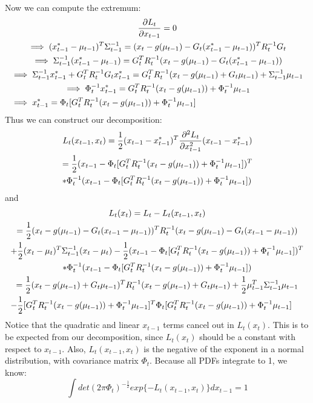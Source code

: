 Now we can compute the extremum:
\begin{multline}
\frac{\partial L_t}{\partial x_{t-1}} = 0 \\
\implies (x_{t-1}^* - \mu_{t-1})^T \Sigma_{t-1}^{-1} = (x_t - g(\mu_{t-1}) - G_t (x_{t-1}^* - \mu_{t-1}))^T R_t^{-1} G_t \\
\implies \Sigma_{t-1}^{-1} (x_{t-1}^* - \mu_{t-1}) = G_t^T R_t^{-1}  (x_t - g(\mu_{t-1}) - G_t (x_{t-1}^* - \mu_{t-1})) \\
\implies \Sigma_{t-1}^{-1} x_{t-1}^* + G_t^T R_t^{-1}G_t x_{t-1}^* = G_t^T R_t^{-1}  (x_t - g(\mu_{t-1}) + G_t \mu_{t-1}) + \Sigma_{t-1}^{-1} \mu_{t-1} \\
\implies \Phi_t^{-1} x_{t-1}^* = G_t^T R_t^{-1}  (x_t - g(\mu_{t-1})) + \Phi_t^{-1} \mu_{t-1} \\
\implies x_{t-1}^* = \Phi_t [G_t^T R_t^{-1}  (x_t - g(\mu_{t-1})) + \Phi_t^{-1} \mu_{t-1}] \hfill
\end{multline}
Thus we can construct our decomposition:
\begin{multline*}
L_t(x_{t-1},x_t) = \frac{1}{2} (x_{t-1} - x_{t-1}^*)^T \frac{\partial^2 L_t}{\partial x_{t-1}^2} (x_{t-1} - x_{t-1}^*) \\
= \frac{1}{2} (x_{t-1} - \Phi_t [G_t^T R_t^{-1}  (x_t - g(\mu_{t-1})) + \Phi_t^{-1} \mu_{t-1}])^T \\
* \Phi_t^{-1} (x_{t-1} - \Phi_t [G_t^T R_t^{-1}  (x_t - g(\mu_{t-1})) + \Phi_t^{-1} \mu_{t-1}]) \hfill
\end{multline*}
and
\begin{multline} \label{eqDefLtxt}
L_t(x_t) = L_t -  L_t(x_{t-1},x_t) \\
= \frac{1}{2} (x_t - g(\mu_{t-1}) - G_t (x_{t-1} - \mu_{t-1}))^T R_t^{-1} (x_t - g(\mu_{t-1}) - G_t (x_{t-1} - \mu_{t-1}))\\
+ \frac{1}{2} (x_t - \mu_t)^T \Sigma_{t-1}^{-1} (x_t - \mu_t) - \frac{1}{2} (x_{t-1} - \Phi_t [G_t^T R_t^{-1}  (x_t - g(\mu_{t-1})) + \Phi_t^{-1} \mu_{t-1}])^T \\
* \Phi_t^{-1} (x_{t-1} - \Phi_t [G_t^T R_t^{-1}  (x_t - g(\mu_{t-1})) + \Phi_t^{-1} \mu_{t-1}]) \\
= \frac{1}{2} (x_t - g(\mu_{t-1}) + G_t \mu_{t-1})^T R_t^{-1} (x_t - g(\mu_{t-1}) + G_t \mu_{t-1}) + \frac{1}{2} \mu_{t-1}^T \Sigma_{t-1}^{-1} \mu_{t-1} \\
- \frac{1}{2} [G_t^T R_t^{-1}  (x_t - g(\mu_{t-1})) + \Phi_t^{-1} \mu_{t-1}]^T \Phi_t [G_t^T R_t^{-1}  (x_t - g(\mu_{t-1})) + \Phi_t^{-1} \mu_{t-1}] \hfill
\end{multline}
Notice that the quadratic and linear \(x_{t-1}\) terms cancel out in \(L_t(x_t)\). This is to be expected from our decomposition, since \(L_t(x_t)\) should be a constant with respect to \(x_{t-1}\). Also, \(L_t(x_{t-1},x_t)\) is the negative of the exponent in a normal distribution, with covariance matrix \(\Phi_t\). Because all PDFs integrate to 1, we know:
\begin{equation} \label{eqLtInt1}
\int det(2 \pi \Phi_t)^{-\frac{1}{2}} exp\{-L_t(x_{t-1},x_t)\}dx_{t-1} = 1
\end{equation}

